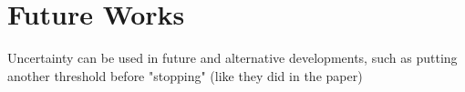 \chapter{Future Works}
\label{cha:future_works}

Uncertainty can be used in future and alternative developments, such as putting another
threshold before "stopping" (like they did in the paper)